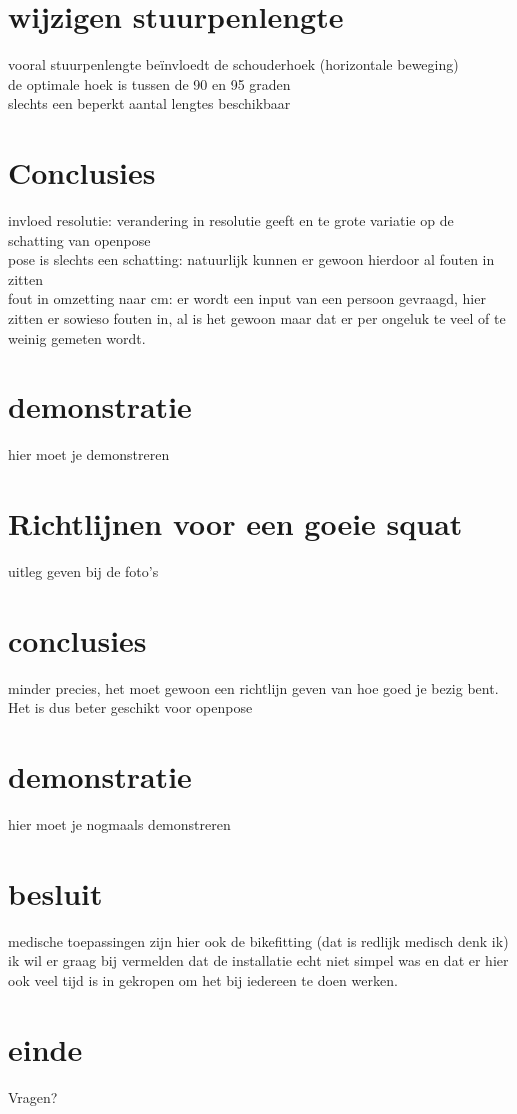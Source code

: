 \documentclass{article}
\begin{document}
	\section{wijzigen stuurpenlengte}
		vooral stuurpenlengte beïnvloedt de schouderhoek (horizontale beweging)\\
		de optimale hoek is tussen de 90 en 95 graden\\
		slechts een beperkt aantal lengtes beschikbaar
	\section{Conclusies}
		invloed resolutie: verandering in resolutie geeft en te grote variatie op de schatting van openpose\\
		pose is slechts een schatting: natuurlijk kunnen er gewoon hierdoor al fouten in zitten\\
		fout in omzetting naar cm: er wordt een input van een persoon gevraagd, hier zitten er sowieso fouten in, al is het gewoon maar dat er per ongeluk te veel of te weinig gemeten wordt.
	\section{demonstratie}
		hier moet je demonstreren
	\section{Richtlijnen voor een goeie squat}
		uitleg geven bij de foto's
	\section{conclusies}
		minder precies, het moet gewoon een richtlijn geven van hoe goed je bezig bent. Het is dus beter geschikt voor openpose
	\section{demonstratie}
		hier moet je nogmaals demonstreren
	\section{besluit}
		medische toepassingen zijn hier ook de bikefitting (dat is redlijk medisch denk ik)\\
		ik wil er graag bij vermelden dat de installatie echt niet simpel was en dat er hier ook veel tijd is in gekropen om het bij iedereen te doen werken.
	\section{einde}
		Vragen?
\end{document}

